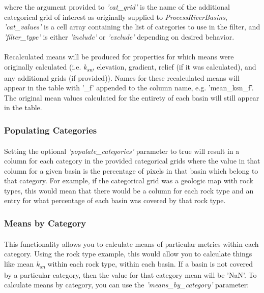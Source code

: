 \noindent
where the argument provided to \textit{'cat\_grid'} is the name of the additional categorical grid of interest as originally supplied to \textit{ProcessRiverBasins}, \textit{'cat\_values'} is a cell array containing the list of categories to use in the filter, and \textit{'filter\_type'} is either \textit{'include'} or \textit{'exclude'} depending on desired behavior.

\paragraph{}Recalculated means will be produced for properties for which means were originally calculated (i.e. \textit{k\textsubscript{sn}}, elevation, gradient, relief (if it was calculated), and any additional grids (if provided)). Names for these recalculated means will appear in the table with '\_f' appended to the column name, e.g. 'mean\_ksn\_f'. The original mean values calculated for the entirety of each basin will still appear in the table.

\subsubsection{Populating Categories}
\paragraph{}Setting the optional \textit{'populate\_categories'} parameter to true will result in a column for each category in the provided categorical grids where the value in that column for a given basin is the percentage of pixels in that basin which belong to that category. For example, if the categorical grid was a geologic map with rock types, this would mean that there would be a column for each rock type and an entry for what percentage of each basin was covered by that rock type.

\subsubsection{Means by Category}
\paragraph{}This functionality allows you to calculate means of particular metrics within each category. Using the rock type example, this would allow you to calculate things like mean \textit{k\textsubscript{sn}} within each rock type, within each basin. If a basin is not covered by a particular category, then the value for that category mean will be 'NaN'. To calculate means by category, you can use the \textit{'means\_by\_category'} parameter:


